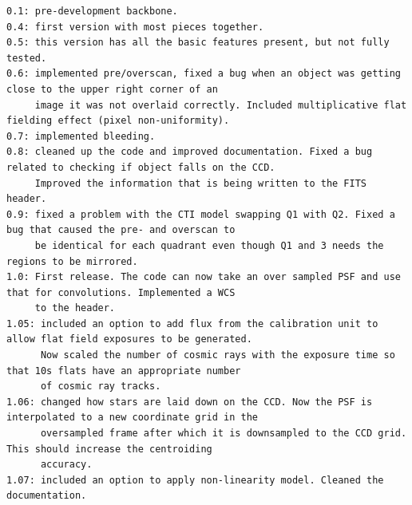 \documentclass[a4paper,12pt,english]{sphinxmanual}
\begin{document}
\begin{Verbatim}[commandchars=\\\{\}]
0.1: pre-development backbone.
0.4: first version with most pieces together.
0.5: this version has all the basic features present, but not fully tested.
0.6: implemented pre/overscan, fixed a bug when an object was getting close to the upper right corner of an
     image it was not overlaid correctly. Included multiplicative flat fielding effect (pixel non-uniformity).
0.7: implemented bleeding.
0.8: cleaned up the code and improved documentation. Fixed a bug related to checking if object falls on the CCD.
     Improved the information that is being written to the FITS header.
0.9: fixed a problem with the CTI model swapping Q1 with Q2. Fixed a bug that caused the pre- and overscan to
     be identical for each quadrant even though Q1 and 3 needs the regions to be mirrored.
1.0: First release. The code can now take an over sampled PSF and use that for convolutions. Implemented a WCS
     to the header.
1.05: included an option to add flux from the calibration unit to allow flat field exposures to be generated.
      Now scaled the number of cosmic rays with the exposure time so that 10s flats have an appropriate number
      of cosmic ray tracks.
1.06: changed how stars are laid down on the CCD. Now the PSF is interpolated to a new coordinate grid in the
      oversampled frame after which it is downsampled to the CCD grid. This should increase the centroiding
      accuracy.
1.07: included an option to apply non-linearity model. Cleaned the documentation.
\end{Verbatim}
\end{document}
